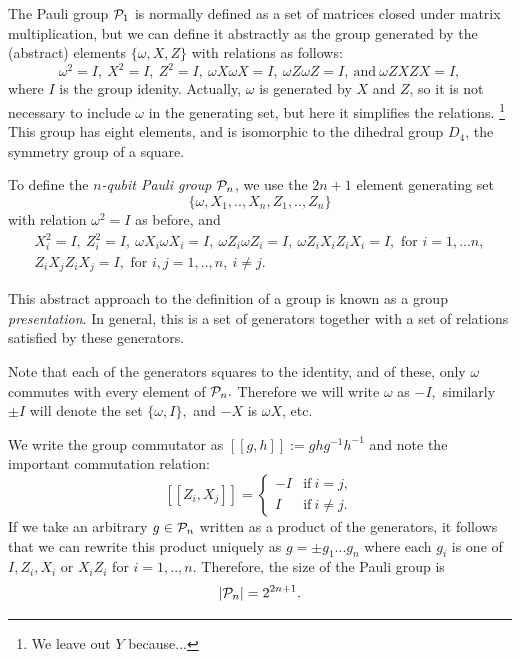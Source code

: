 \documentclass[12pt]{article}
\begin{document}
The Pauli group $\mathcal{P}_1$ is normally 
defined as a set of matrices closed under
matrix multiplication, but we can define
it abstractly
as the group generated
by the (abstract) elements $\{\omega, X, Z\}$ with
relations as follows:
$$
\omega^2=I,\ X^2=I,\ Z^2=I,\ \omega X\omega X=I,\ \omega Z\omega Z=I,\ \mbox{and}\  \omega ZXZX=I,
$$
where $I$ is the group idenity.
Actually, $\omega $ is generated by $X$ and $Z$, so
it is not necessary to include $\omega $ in the generating set,
but here it simplifies the relations.
\footnote{We leave out $Y$ because...}
This group has eight elements, and is isomorphic to the dihedral group $D_4$,
the symmetry group of a square.

To define
the {\it $n$-qubit Pauli group} $\mathcal{P}_n$, 
we use the $2n+1$ element 
generating set 
$$\{\omega , X_1, .., X_n, Z_1, .., Z_n\}$$
with relation $\omega^2=I$ as before, and
\begin{equation}\label{presentation}
\begin{array}{c}
X_i^2=I,\ Z_i^2=I,\ \omega X_i\omega X_i=I,\ \omega Z_i\omega Z_i=I,\ \omega Z_iX_iZ_iX_i=I, 
\mbox{\ for\ } i=1,...n,\\
Z_iX_jZ_iX_j=I, \mbox{\ for\ } i, j = 1,..,n,\ i\ne j.
\end{array}
\end{equation}

This abstract approach to the definition of a group is known as
a group \emph{presentation}. In general, this is a set of
generators together with a set of relations satisfied
by these generators.

Note that each of the generators squares to the identity,
and of these, only $\omega$ commutes with every element of $\mathcal{P}_n.$
Therefore we will write $\omega$ as $-I,$
similarly $\pm I$ will denote the
set $\{\omega, I\},$ and $-X$ is $\omega X$, etc.

We write the group commutator as
$[[g, h]]:=ghg^{-1}h^{-1}$
and note the important commutation relation:
$$
    [[Z_i, X_j]] = 
    \left\{ \begin{array}{ll}
 -I &\mbox{if}\ i=j,\\
 I &\mbox{if}\ i\ne j.\end{array}\right.
$$
If we take an arbitrary $g\in \mathcal{P}_n$
written as a product of the generators,
it follows that we can rewrite this
product uniquely as %
$ g = \pm g_1 ... g_n $
where each $g_i$ is one of $I, Z_i, X_i$ or $X_i Z_i$
for $i=1,..,n.$
Therefore, the size of the
Pauli group is 
$$
    |\mathcal{P}_n| = 2^{2n+1}.
$$
\end{document}
